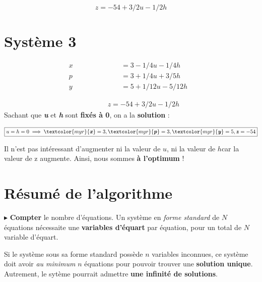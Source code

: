 \documentclass{report}
\newcommand{\Pointilles}[1]{%
  \par\nobreak
  \noindent\rule{0pt}{1.5\baselineskip}%
  \multido{}{#1}{\noindent\makebox[\linewidth]{\dotfill}\endgraf}%
  \bigskip%
}
\begin{document}
\begin{multicols*}{3}
\vspace{-1.25em}
      \[%
    \boxed{z = -54 +3/2u -1/2h}
      \]%

\section{Système 3}
\begin{align*}
    x \quad\quad\quad\quad\quad\quad &= 3 - 1/4u -1/4h& \\
    p \quad\quad\quad\quad  &= 3 +1/4u +3/5h& \\
    y \quad\quad &= 5 + 1/12u -5/12h&
\end{align*}
\vspace{-2.5em}    
\Pointilles{1}
\vspace{-2.5em}
\begin{align*}
    \quad\quad\quad\;\; z = -54 +3/2u -1/2h
\end{align*}
Sachant que 
\textcolor{myb}{\textbf{\textit{u}}} et 
\textcolor{myb}{\textbf{\textit{h}}}  sont \textbf{fixés à 0}, 
on a la \textbf{solution} : 

\begin{align*}
\boxed{u = h = 0 \implies 
\textcolor{myr}{\textbf{\textit{x}}}  = 3, 
\textcolor{myr}{\textbf{\textit{p}}} = 3,
\textcolor{myr}{\textbf{\textit{y}}} = 5,
\textbf{\textit{z}} = -54}
\end{align*}

Il n’est pas intéressant d’augmenter ni la valeur de $u$, ni la valeur de $h$car la valeur 
de z augmente. Ainsi, nous sommes \textbf{à l’optimum} !

\end{multicols*}

\section{Résumé de l'algorithme}

\noindent 
$\blacktriangleright$ \textbf{Compter} le nombre d'équations. Un système 
en \textit{forme standard} de $N$ équations nécessaite une 
\textcolor{myb}{\textbf{variables d'équart}} par équation, pour un total de 
$N$ variable d'équart. 

\begin{note}{}{}
    Si le système sous sa forme standard possède $n$ variables inconnues, ce système 
    doit avoir \textit{au minimum} $n$ équations pour pouvoir trouver une 
    \textcolor{myb}{\textbf{solution unique}}. Autrement, le sytème pourrait 
    admettre \textbf{une infinité de solutions}.   
\end{note}
\end{document}
